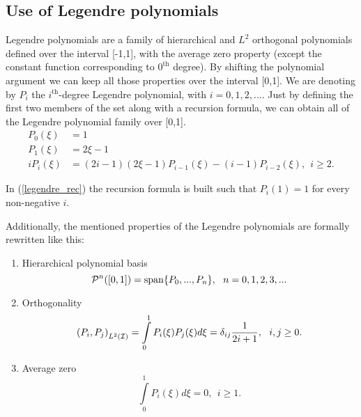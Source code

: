 \subsection{Use of Legendre polynomials}
\label{usinglegendre}
Legendre polynomials are a family of hierarchical and $L^2$ orthogonal polynomials defined over the interval [-1,1], with the average zero property (except the constant function corresponding to $0^\text{th}$ degree). By shifting the polynomial argument we can keep all those properties over the interval [0,1]. We are denoting by $P_i$ the $i^\text{th}$-degree Legendre polynomial, with $i=0,1,2,...$. Just by defining the first two members of the set along with a recursion formula, we can obtain all of the Legendre polynomial family over [0,1].
% 
\begin{align}
    P_0(\xi)&=1 \label{leg0} \\
    P_1(\xi)&=2\xi-1 \\
    iP_i(\xi)&=(2i-1)(2\xi-1)P_{i-1}(\xi)-(i-1)P_{i-2}(\xi),\ \ i\geq 2.\label{legendre_rec}
\end{align}

In (\ref{legendre_rec}) the recursion formula is built such that $P_i(1)=1$ for every non-negative $i$.

Additionally, the mentioned properties of the Legendre polynomials are formally rewritten like this:
\begin{enumerate}
    \item Hierarchical polynomial basis
    \begin{equation}
        \mcP^n([0,1])=\spann\{P_0,...,P_n\},\ \ n=0,1,2,3,...\label{hier_leg}
    \end{equation}
    \item Orthogonality
    \begin{equation}
        \left(P_i,P_j\right)_{L^2(\mathcal{I})}=\int\limits_0^1 P_i(\xi)P_j(\xi)d\xi=\delta_{ij}\frac{1}{2i+1},\ \ i,j\geq 0.\label{orth_leg}
    \end{equation}
    \item Average zero
    \begin{equation}
        \int\limits_0^1 P_i(\xi)d\xi=0,\ \ i\geq 1. \label{avgzero}
    \end{equation}    
\end{enumerate}
% 

